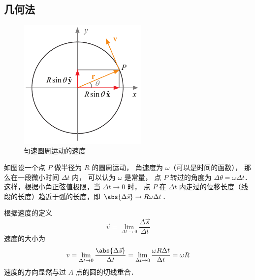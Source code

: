 
\subsection{几何法}

\begin{figure}[ht]
\centering
\includegraphics[width=6.3cm]{./figures/CMVD1.pdf}
\caption{匀速圆周运动的速度} \label{CMVD_fig1}
\end{figure}

如图设一个点 $P$ 做半径为 $R$ 的圆周运动， 角速度为 $\omega $（可以是时间的函数）， 那么在一段微小时间 $\Delta t$ 内， 可以认为 $\omega$ 是常量， 点 $P$ 转过的角度为 $\Delta \theta  = \omega \Delta t$． 这样，根据小角正弦值极限，当 $\Delta t \to 0$ 时， 点 $P$ 在 $\Delta t$ 内走过的位移长度（线段的长度）趋近于弧的长度，即 $\abs{\Delta \vec s} \to R\omega \Delta t$．  

根据速度的定义
\begin{equation}
\vec v = \lim_{\Delta t \to 0} \frac{\Delta \vec s}{\Delta t}
\end{equation}
速度的大小为
\begin{equation}
v = \lim_{\Delta t \to 0} \frac{\abs{\Delta \vec s}}{\Delta t} = \lim_{\Delta t \to 0} \frac{\omega R \Delta t}{\Delta t} = \omega R 
\end{equation}
速度的方向显然与过 $A$ 点的圆的切线重合．

